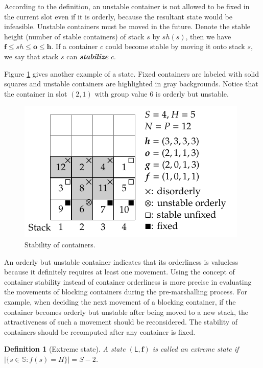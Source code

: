 \documentclass[review,3p,times,12pt,number]{elsarticle}\usepackage{amsmath}\usepackage{amssymb}
\newtheorem{definition}{Definition}
\renewcommand{\emph}[1]{\textbf{\textit{#1}}}
\begin{document}
According to the definition, an unstable container is not allowed to be fixed in the current slot even if it is orderly, because the resultant state would be infeasible.
Unstable containers must be moved in the future. Denote the stable height (number of stable containers) of stack $s$ by $\mathit{sh}(s)$, then we have $\boldsymbol{f}\le \boldsymbol{\mathit{sh}}\le \boldsymbol{o}\le \boldsymbol{h}$. If a container $c$ could become stable by moving it onto stack $s$, we say that stack $s$ can \emph{stabilize} $c$.

Figure \ref{fig:stable} gives another example of a state. Fixed containers are labeled with solid squares and unstable containers are highlighted in gray backgrounds. Notice that the container in slot $(2,1)$ with group value $6$ is orderly but unstable.

\begin{figure}[htbp]
\centering
\includegraphics{figs/stable.pdf}
\caption{Stability of containers.}
\label{fig:stable}
\end{figure}

An orderly but unstable container indicates that its orderliness is valueless because it definitely requires at least one movement.
Using the concept of container stability instead of container orderliness is more precise in evaluating the movements of blocking containers during the pre-marshalling process.
For example, when deciding the next movement of a blocking container, if the container becomes orderly but unstable after being moved to a new stack, the attractiveness of such a movement should be reconsidered. The stability of containers should be recomputed after any container is fixed.



\begin{definition}[Extreme state]
A state $(\mathsf{L},\boldsymbol{f})$ is called an extreme state if $|\{s\in\mathbb{S}: f(s)=H\}|= S-2$.
\end{definition}
\end{document}
